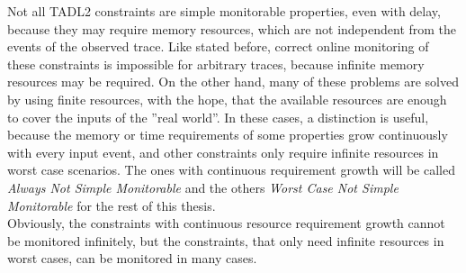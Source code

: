 	
		Not all TADL2 constraints are simple monitorable properties, even with delay, because they may require memory resources, which are not independent from the events of the observed trace. Like stated before, correct online monitoring of these constraints is impossible for arbitrary traces, because infinite memory resources may be required. On the other hand, many of these problems are solved by using finite resources, with the hope, that the available resources are enough to cover the inputs of the ''real world''.
		In these cases, a distinction is useful, because the memory or time requirements of some properties grow continuously with every input event, and other constraints only require infinite resources in worst case scenarios. 
		The ones with continuous requirement growth will be called \emph{Always Not Simple Monitorable} and the others \emph{Worst Case Not Simple Monitorable} for the rest of this thesis.\\
		Obviously, the constraints with continuous resource requirement growth cannot be monitored infinitely, but the constraints, that only need infinite resources in worst cases, can be monitored in many cases.

	 